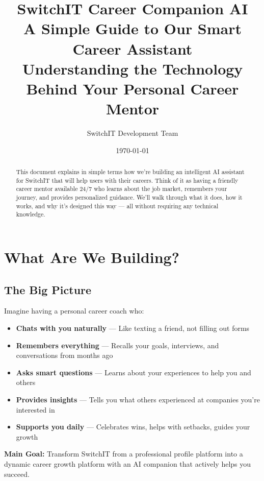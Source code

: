 \documentclass[12pt,a4paper]{article}
\title{\textbf{\Huge SwitchIT Career Companion AI}\\[0.5cm]
\Large A Simple Guide to Our Smart Career Assistant\\[0.3cm]
\large Understanding the Technology Behind Your Personal Career Mentor}
\author{SwitchIT Development Team}
\date{\today}
\begin{document}
\maketitle

\begin{abstract}
This document explains in simple terms how we're building an intelligent AI assistant for SwitchIT that will help users with their careers. Think of it as having a friendly career mentor available 24/7 who learns about the job market, remembers your journey, and provides personalized guidance. We'll walk through what it does, how it works, and why it's designed this way — all without requiring any technical knowledge.
\end{abstract}

\newpage
\tableofcontents
\newpage

\section{What Are We Building?}

\subsection{The Big Picture}

Imagine having a personal career coach who:

\begin{itemize}[leftmargin=*]
  \item \textbf{Chats with you naturally} — Like texting a friend, not filling out forms
  \item \textbf{Remembers everything} — Recalls your goals, interviews, and conversations from months ago
  \item \textbf{Asks smart questions} — Learns about your experiences to help you and others
  \item \textbf{Provides insights} — Tells you what others experienced at companies you're interested in
  \item \textbf{Supports you daily} — Celebrates wins, helps with setbacks, guides your growth
\end{itemize}

\begin{keypoint}
\textbf{Main Goal:} Transform SwitchIT from a professional profile platform into a dynamic career growth platform with an AI companion that actively helps you succeed.
\end{keypoint}
\end{document}
